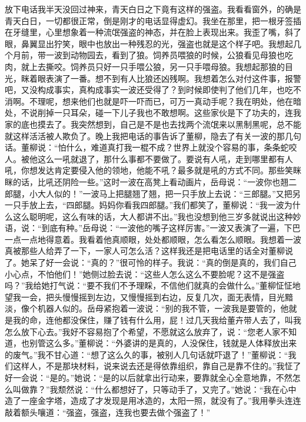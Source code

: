 \documentclass[12pt,oneside]{book}
\begin{document}
放下电话我半天没回过神来，青天白日之下竟有这样的强盗。我看看窗外，的确是青天白日，一切都很正常，倒是刚才的电话显得虚幻。我坐在那里，把一根牙签插在牙缝里，心里想象着一种流氓强盗的神态，并在脸上表现出来。我歪了嘴，斜了眼，鼻翼显出狞笑，眼中也放出一种残忍的光，强盗也就是这个样子吧。我想起几个月前，带一波到动物园去，看到了狼。饲养员喂狼的时候，公狼看见母狼也吃肉，就上去撕咬。饲养员只好一只手喂公狼，另一只手喂母狼。我想起那狼的目光，眯着眼表演了一番。想不到有人比狼还凶残啊。我想着怎么对付这件事，报警吧，又没构成事实，真构成事实一波还受得了？到时候即使判了他们几年，也吃不消啊。不理呢，想来他们也就是吓一吓而已，可万一真动手呢？我在明处，他在暗处，不说削掉一只耳朵，碰一下儿子我也不敢想啊。这些家伙是下了功夫的，连我家的底也摸去了。我突然想到，自己是不是也去找两个流氓来以黑制黑呢，总不能就这样活活被人欺负了。晚上我把电话的事告诉了董柳，隐去了有关一波的那几句话。董柳说：``怕什么，难道真打我一棍不成？世界上就没个容易的事，条条蛇咬人。被他这么一吼就退了，那什么事都不要做了。要说有人吼，走到哪里都有人吼，你想发达肯定要侵入他的领地，他能不吼？最多就是吼的方式不同。那些笑眯眯的话，比吼还阴险一些。''这时一波在高凳上看动画片，岳母说：``一波你也翘二郎腿，小大人似的！''一波马上把腿翘了翘，把一只手放上去说：``三郎腿。''又把另一只手放上去，``四郎腿。妈妈你看我四郎腿。''我们都笑了，董柳说：``我一波为什么这么聪明呢，这么有味的话，大人都讲不出。''我也没想到他三岁多就说出这种妙语，说：``到底有种。''岳母说：``一波他的嘴子这样厉害。''一波又表演了一遍，下巴一点一点地得意着。我看着他真顺眼，处处都顺眼，怎么看怎么顺眼。我想着一波真被那些人给弄了一下，一家人可怎么活？这样我还是把电话里的话全对董柳说了。她呆了好一会说：``真的？''很可怜的样子。我说：``真的倒是真的，我们自己小心点，不怕他们！''她侧过脸去说：``这些人怎么这么不要脸呢？这不是强盗吗？''我给她打气说：``要不我们不予理睬，不信他们就真的会做什么。''董柳怔怔地望我一会，把头慢慢摇到左边，又慢慢摇到右边，反复几次，面无表情，目光黯淡，像个机器人似的。岳母紧抱着一波说：``别的我不管，一波我是要管的，他就是我的命，连他都没保住，赚了钱有什么用，屁！过几天我给董卉带人去了，叫我怎么放下心去。''我好不容易抱了个希望，不愿就这么放弃了，说：``您老人家不知道，也别管这么多。''董柳说：``外婆讲的是真的，人没保住，钱就是人体释放出来的废气。''我不甘心道：``想了这么久的事，被别人几句话就吓退了！''董柳说：``我们这样人，不是那块材料，说来说去还是得依靠组织，靠自己是靠不住的。''我怔了好一会说：``是的。''她说：``是的以后就拿出行动来，要靠就全心全意地靠，不然怎么叫做靠？''我颓然说：``什么都想好了，只等动手了，又完了。''她说：``我在心中造了一座金字塔，造成了才发现是用冰造的，太阳一照，就没有了。''我用拳头连连敲着额头嚷道：``强盗，强盗，连我也要去做个强盗了！''
\end{document}
